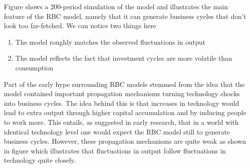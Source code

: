 \documentclass{beamer}
\begin{document}
\begin{frame}
  Figure shows a 200-period simulation of the model and illustrates the main feature of the RBC model, namely that it can generate business cycles that don't look too far-fetched. 
We can notice two things here
\begin{enumerate}
  \item The model roughly matches the observed fluctuations in output
  \item The model reflects the fact that investment cycles are more volatile than consumption
\end{enumerate}
\end{frame}

\begin{frame}
  Part of the early hype surrounding RBC models stemmed from the idea that the model contained important propagation mechanisms turning technology shocks into business cycles. 
The idea behind this is that increases in technology would lead to extra output through higher capital accumulation and by inducing people to work more. 
This entails, as suggested in early research, that in a world with identical technology level one would expect the RBC model still to generate business cycles. 
However, these propagation mechanisms are quite weak as shown in figure which illustrates that fluctuations in output follow fluctuations in technology quite closely.
\end{frame}




\end{document}
